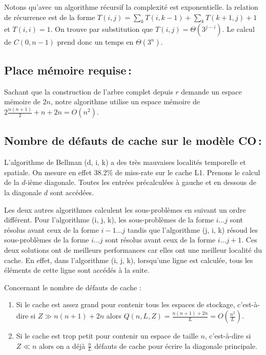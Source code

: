 \documentclass[a4paper, 10pt, french]{article}
\begin{document}
Notons qu'avec un algorithme récursif la complexité est exponentielle. la relation de récurrence est de la forme $T(i, j) = \sum_k T(i, k - 1) + \sum_k T(k + 1, j) + 1$ et $T(i, i) = 1$. On trouve par substitution que $T(i, j) = \Theta(3^{j - i})$. Le calcul de $C(0, n - 1)$ prend donc un temps en $\Theta(3^n)$.
\subsection{Place mémoire requise\,: }
Sachant que la construction de l'arbre complet depuis $r$ demande un espace mémoire de $2n$, notre algorithme utilise un espace mémoire de $2\frac{n(n+1)}{2} + n + 2n = O(n^2)$. \par\leavevmode\par

\subsection{Nombre de défauts de cache sur le modèle CO\,: }

L'algorithme de Bellman (d, i, k) a des très mauvaises localités temporelle et spatiale. On mesure en effet 38.2\% de miss-rate sur le cache L1. Prenons le calcul de la $d$-ième diagonale. Toutes les entrées précalculées à gauche et en dessous de la diagonale $d$ sont accédées.

Les deux autres algorithmes calculent les sous-problèmes en suivant un ordre différent. Pour l'algorithme (i, j, k), les sous-problèmes de la forme $i \ldots j$ sont résolus avant ceux de la forme $i - 1 \ldots j$ tandis que l'algorithme (j, i, k) résoud les sous-problèmes de la forme $i \ldots j$ sont résolus avant ceux de la forme $i \ldots j + 1$. Ces deux solutions ont de meilleurs performances car elles ont une meilleur localité du cache. En effet, dans l'algorithme (i, j, k), lorsqu'une ligne est calculée, tous les éléments de cette ligne sont accédés à la suite.

Concernant le nombre de défauts de cache :
\begin{enumerate}
  \item Si le cache est assez grand pour contenir tous les espaces de stockage, c'est-à-dire si $Z \gg n(n+1) + 2n$ alors $Q(n, L, Z) = \frac{n(n+1) + 2n}{L} = O(\frac{n^2}{L})$.
  \item Si le cache est trop petit pour contenir un espace de taille $n$, c'est-à-dire si $Z \ll n$ alors on a déjà $\frac{n}{L}$ défauts de cache pour écrire la diagonale principale.
\end{enumerate}
\end{document}
